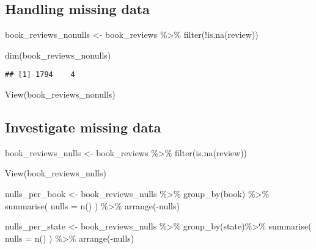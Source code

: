 \documentclass[
]{article}
\newenvironment{Shaded}{\begin{snugshade}}{\end{snugshade}}
\newcommand{\AttributeTok}[1]{\textcolor[rgb]{0.77,0.63,0.00}{#1}}
\newcommand{\FunctionTok}[1]{\textcolor[rgb]{0.00,0.00,0.00}{#1}}
\newcommand{\NormalTok}[1]{#1}
\newcommand{\OtherTok}[1]{\textcolor[rgb]{0.56,0.35,0.01}{#1}}
\newcommand{\SpecialCharTok}[1]{\textcolor[rgb]{0.00,0.00,0.00}{#1}}
\begin{document}
\hypertarget{handling-missing-data}{%
\subsection{Handling missing data}\label{handling-missing-data}}

\begin{Shaded}
\begin{Highlighting}[]
\NormalTok{book\_reviews\_nonulls }\OtherTok{\textless{}{-}}\NormalTok{ book\_reviews }\SpecialCharTok{\%\textgreater{}\%}
  \FunctionTok{filter}\NormalTok{(}\SpecialCharTok{!}\FunctionTok{is.na}\NormalTok{(review))}

\FunctionTok{dim}\NormalTok{(book\_reviews\_nonulls)}
\end{Highlighting}
\end{Shaded}

\begin{verbatim}
## [1] 1794    4
\end{verbatim}

\begin{Shaded}
\begin{Highlighting}[]
\FunctionTok{View}\NormalTok{(book\_reviews\_nonulls)}
\end{Highlighting}
\end{Shaded}

\hypertarget{investigate-missing-data}{%
\subsection{Investigate missing data}\label{investigate-missing-data}}

\begin{Shaded}
\begin{Highlighting}[]
\NormalTok{book\_reviews\_nulls }\OtherTok{\textless{}{-}}\NormalTok{ book\_reviews }\SpecialCharTok{\%\textgreater{}\%}
  \FunctionTok{filter}\NormalTok{(}\FunctionTok{is.na}\NormalTok{(review))}

\FunctionTok{View}\NormalTok{(book\_reviews\_nulls)}

\NormalTok{nulls\_per\_book }\OtherTok{\textless{}{-}}\NormalTok{ book\_reviews\_nulls }\SpecialCharTok{\%\textgreater{}\%}
  \FunctionTok{group\_by}\NormalTok{(book) }\SpecialCharTok{\%\textgreater{}\%}
  \FunctionTok{summarise}\NormalTok{(}
    \AttributeTok{nulls =} \FunctionTok{n}\NormalTok{()}
\NormalTok{  ) }\SpecialCharTok{\%\textgreater{}\%}
  \FunctionTok{arrange}\NormalTok{(}\SpecialCharTok{{-}}\NormalTok{nulls)}

\NormalTok{nulls\_per\_state }\OtherTok{\textless{}{-}}\NormalTok{ book\_reviews\_nulls }\SpecialCharTok{\%\textgreater{}\%}
  \FunctionTok{group\_by}\NormalTok{(state)}\SpecialCharTok{\%\textgreater{}\%}
  \FunctionTok{summarise}\NormalTok{(}
    \AttributeTok{nulls =} \FunctionTok{n}\NormalTok{()}
\NormalTok{  ) }\SpecialCharTok{\%\textgreater{}\%}
  \FunctionTok{arrange}\NormalTok{(}\SpecialCharTok{{-}}\NormalTok{nulls)}
\end{Highlighting}
\end{Shaded}
\end{document}
